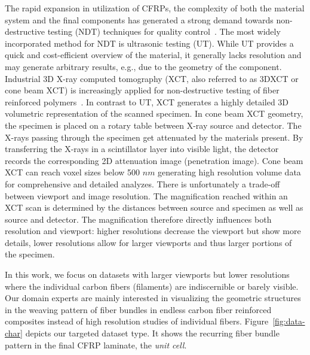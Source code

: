 The rapid expansion in utilization of CFRPs, the complexity of both the material system and the final components has generated a strong demand towards non-destructive testing (NDT) techniques for quality control~\cite{Red2012}. The most widely incorporated method for NDT is ultrasonic testing (UT). While UT provides a quick and cost-efficient overview of the material, it generally lacks resolution and may generate arbitrary results, e.g., due to the geometry of the component. Industrial 3D X-ray computed tomography (XCT, also referred to as 3DXCT or cone beam XCT) is increasingly applied for non-destructive testing of fiber reinforced polymers~\cite{Kastner2012}. In contrast to UT, XCT generates a highly detailed 3D volumetric representation of the scanned specimen. In cone beam XCT geometry, the specimen is placed on a rotary table between X-ray source and detector. The X-rays passing through the specimen get attenuated by the materials present. By transferring the X-rays in a scintillator layer into visible light, the detector records the corresponding 2D attenuation image (penetration image). 
Cone beam XCT can reach voxel sizes below 500 $nm$ generating high resolution volume data for comprehensive and detailed analyzes. There is unfortunately a trade-off between viewport and image resolution. The magnification reached within an XCT scan is determined by the distances between source and specimen as well as source and detector. The magnification therefore directly influences both resolution and viewport: higher resolutions decrease the viewport but show more details, lower resolutions allow for larger viewports and thus larger portions of the specimen.

In this work, we focus on datasets with larger viewports but
lower resolutions where the individual carbon fibers (filaments) are indiscernible or barely visible. Our domain experts are mainly interested in visualizing the geometric structures in the weaving pattern of fiber bundles in endless carbon fiber reinforced composites instead of high resolution studies of individual fibers.
Figure~\ref{fig:data-char} depicts our targeted dataset type. It shows the recurring fiber bundle pattern in the final CFRP laminate, the \textit{unit cell}.


